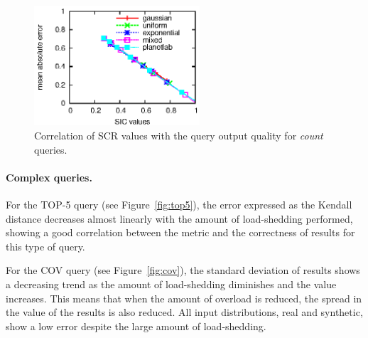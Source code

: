 \begin{figure}
\centering
\includegraphics[width=0.55\textwidth]{img/tesi/count1}
\caption{Correlation of SCR values with the query output quality for \emph{count} queries.}
\label{fig:agg-count}
\end{figure}
\paragraph{Complex queries.}
For the \textnormal{TOP-5} query (see Figure~\ref{fig:top5}), the error expressed as the Kendall distance
decreases almost linearly with the amount of \mbox{load-shedding} performed, showing a good correlation
between the \sic metric and the correctness of results for this type of query. 

For the \textnormal{COV} query (see Figure~\ref{fig:cov}), the standard deviation of results shows a
decreasing trend as the amount of \mbox{load-shedding} diminishes and the \sic value increases. This means that
when the amount of overload is reduced, the spread in the value of the results is also reduced.
All input distributions, real and synthetic, show a low error despite the large amount of
\mbox{load-shedding}. 

